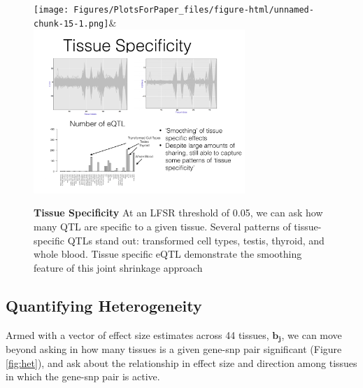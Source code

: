 \newline
\begin{figure}[htbp]
\begin{center}
\texttt{[image: Figures/PlotsForPaper\_files/figure-html/unnamed-chunk-15-1.png]}&
\includegraphics[width=8cm]{Figures/tspecsmooth.pdf}
\end{center}
\caption{\textbf{Tissue Specificity} At an LFSR threshold of 0.05, we can ask how many QTL are specific to a given tissue. Several patterns of tissue-specific QTLs stand out: transformed cell types, testis, thyroid, and whole blood. Tissue specific eQTL demonstrate the smoothing feature of this joint shrinkage approach}
\label{fig:tspec}
\end{figure}\newline




\subsection{Quantifying Heterogeneity}


Armed with a vector of effect size estimates across 44 tissues, $\bm{b_{j}}$, we can move beyond asking in how many tissues is a given gene-snp pair significant (Figure \ref{fig:het}), and ask about the relationship in effect size and direction among tissues in which the gene-snp pair is active.


